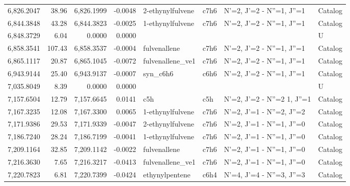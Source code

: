 \begin{longtable}{rrrrllll}
 6,826.2047 &     38.96 &        6,826.1999 &   -0.0048 &            2-ethynylfulvene &    c7h6 &            N'=2, J'=2 - N''=1, J''=1 &    Catalog \\
 6,844.3848 &     43.28 &        6,844.3823 &   -0.0025 &            1-ethynylfulvene &    c7h6 &            N'=2, J'=2 - N''=1, J''=1 &    Catalog \\
 6,848.3729 &      6.04 &            0.0000 &    0.0000 &                             &         &                                      &          U \\
 6,858.3541 &    107.43 &        6,858.3537 &   -0.0004 &                fulvenallene &    c7h6 &            N'=2, J'=2 - N''=1, J''=1 &    Catalog \\
 6,865.1117 &     20.87 &        6,865.1045 &   -0.0072 &            fulvenallene_ve1 &    c7h6 &            N'=2, J'=2 - N''=1, J''=1 &    Catalog \\
 6,943.9144 &     25.40 &        6,943.9137 &   -0.0007 &                    syn_c6h6 &    c6h6 &            N'=2, J'=2 - N''=1, J''=1 &    Catalog \\
 7,035.8049 &      8.39 &            0.0000 &    0.0000 &                             &         &                                      &          U \\
 7,157.6504 &     12.79 &        7,157.6645 &    0.0141 &                         c5h &     c5h &      N'=2, J'=2 - N''=2     1, J''=1 &    Catalog \\
 7,167.3235 &     12.08 &        7,167.3300 &    0.0065 &            1-ethynylfulvene &    c7h6 &            N'=2, J'=1 - N''=2, J''=2 &    Catalog \\
 7,171.9386 &     29.53 &        7,171.9339 &   -0.0047 &            2-ethynylfulvene &    c7h6 &            N'=2, J'=1 - N''=1, J''=0 &    Catalog \\
 7,186.7240 &     28.24 &        7,186.7199 &   -0.0041 &            1-ethynylfulvene &    c7h6 &            N'=2, J'=1 - N''=1, J''=0 &    Catalog \\
 7,209.1164 &     32.85 &        7,209.1142 &   -0.0022 &                fulvenallene &    c7h6 &            N'=2, J'=1 - N''=1, J''=0 &    Catalog \\
 7,216.3630 &      7.65 &        7,216.3217 &   -0.0413 &            fulvenallene_ve1 &    c7h6 &            N'=2, J'=1 - N''=1, J''=0 &    Catalog \\
 7,220.7823 &      6.81 &        7,220.7399 &   -0.0424 &              ethynylpentene &    c6h4 &            N'=4, J'=4 - N''=3, J''=3 &    Catalog \\

\end{longtable}
